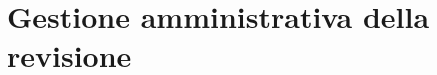 %


\section{Gestione amministrativa della revisione}
		\label{sub:gestione_amministrativa_della_revisione}


